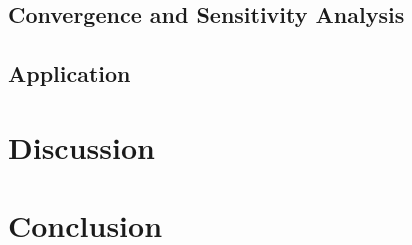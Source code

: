 \subsection{Convergence and Sensitivity Analysis}





\subsection{Application}






\section{Discussion}







\section*{Conclusion}










